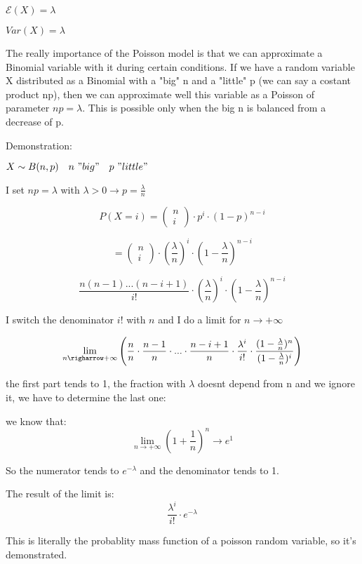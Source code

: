 \documentclass{article}
\begin{document}
\bigskip

$\mathcal E(X) = \lambda$

$Var(X) = \lambda$
\bigskip

The really importance of the Poisson model is that we can approximate a Binomial variable with it during certain conditions.
If we have a random variable X distributed as a Binomial with a "big" n and a "little" p (we can say a costant product np), then we can approximate well this variable as a Poisson of parameter $np = \lambda$.
This is possible only when the big n is balanced from a decrease of p.

\bigskip

Demonstration:

$X \sim B(n,p) \ \ \ n \ "big" \ \ \ p \ "little"$

I set $np = \lambda$ with $\lambda > 0 \longrightarrow p = \frac{\lambda}{n}$

$$P(X=i) = \left(\begin{array}{c} n \\ i \end{array} \right) \cdot p^i \cdot (1-p)^{n-i}$$

$$= \left(\begin{array}{c} n \\ i \end{array} \right) \cdot (\frac{\lambda}{n})^i \cdot (1 - \frac{\lambda}{n})^{n-i}$$

$$\frac{n(n-1)...(n-i+1)}{i!} \cdot (\frac{\lambda}{n})^i \cdot (1 - \frac{\lambda}{n})^{n-i}$$

I switch the denominator $i!$ with $n$ and I do a limit for $n \rightarrow + \infty$ 

$$\lim_{n \righarrow + \infty} \left(\frac{n}{n} \cdot \frac{n-1}{n} \cdot ... \cdot \frac{n - i + 1}{n} \cdot \frac{\lambda^i}{i!} \cdot \frac{(1 - \frac{\lambda}{n})^n}{(1 - \frac{\lambda}{n})^i}\right)$$

the first part tends to 1, the fraction with $\lambda$ doesnt depend from n and we ignore it, we have to determine the last one:
\bigskip

we know that: $$\lim_{n \rightarrow + \infty} (1 + \frac{1}{n})^n \rightarrow e^1$$

So the numerator tends to $e^{- \lambda}$ and the denominator tends to 1.

The result of the limit is: $$\frac{\lambda^i}{i!} \cdot e^{- \lambda}$$

This is literally the probablity mass function of a poisson random variable, so it's demonstrated.
\end{document}
